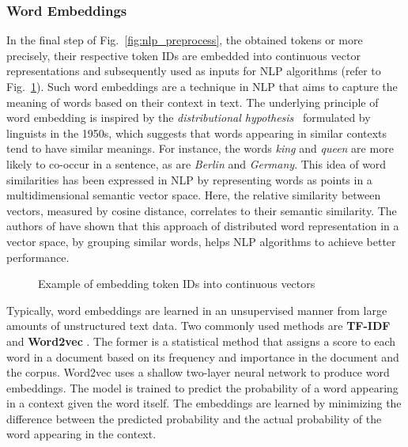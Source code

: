 \subsubsection{Word Embeddings} \label{subsec:word_embeddings}

In the final step of Fig.~\ref{fig:nlp_preprocess}, the obtained tokens or more
precisely, their respective token IDs are embedded into continuous vector
representations and subsequently used as inputs for NLP algorithms (refer to
Fig.~\ref{fig:embedding}). Such word embeddings are a technique in NLP that aims
to capture the meaning of words based on their context in text. The underlying
principle of word embedding is inspired by the \textit{distributional
hypothesis}~\cite{harris1954distributional} formulated by linguists in the
1950s, which suggests that words appearing in similar contexts tend to have
similar meanings. For instance, the words \textit{king} and \textit{queen} are
more likely to co-occur in a sentence, as are \textit{Berlin} and
\textit{Germany}. This idea of word similarities has been expressed in NLP by
representing words as points in a multidimensional semantic vector space. Here,
the relative similarity between vectors, measured by cosine distance, correlates
to their semantic similarity. The authors of \cite{mikolov2013distributed} have
shown that this approach of distributed word representation in a vector space,
by grouping similar words, helps NLP algorithms to achieve better performance.

\begin{figure}[htb]
    \centering
    
    \caption{Example of embedding token IDs into continuous vectors}
    \label{fig:embedding}
\end{figure}

Typically, word embeddings are learned in an unsupervised manner from large
amounts of unstructured text data. Two commonly used methods are \textbf{TF-IDF}
\cite{luhn1957statistical, sparck1972statistical} and \textbf{Word2vec}
\cite{mikolov2013distributed}. The former is a statistical method that assigns a
score to each word in a document based on its frequency and importance in the
document and the corpus. Word2vec uses a shallow two-layer neural network to
produce word embeddings. The model is trained to predict the probability of a
word appearing in a context given the word itself. The embeddings are learned by
minimizing the difference between the predicted probability and the actual
probability of the word appearing in the context.

